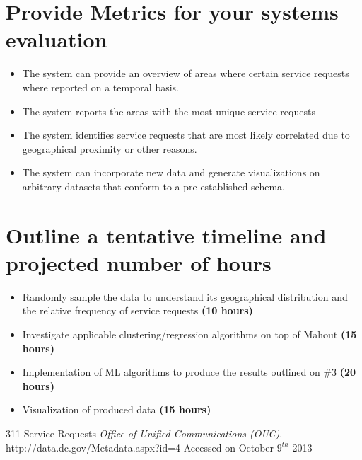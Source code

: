 \documentclass[a4paper,10pt]{article}
\begin{document}
\section{Provide Metrics for your systems evaluation}
\begin{itemize}
\item The system can provide an overview of areas where certain service requests where reported on a temporal basis. 
\item The system reports the areas with the most unique service requests
\item The system identifies service requests that are most likely correlated due to geographical proximity or other reasons.
\item The system can incorporate new data and generate visualizations on arbitrary datasets that conform to a pre-established schema.
\end{itemize}

\section{Outline a tentative timeline and projected number of hours}
\begin{itemize}
\item Randomly sample the data to understand its geographical distribution and the relative frequency of service requests \textbf{(10 hours)}
\item Investigate applicable clustering/regression algorithms on top of Mahout \textbf{(15 hours)}
\item Implementation of ML algorithms to produce the results outlined on \#3 \textbf{(20 hours)}
\item Visualization of produced data \textbf{(15 hours)}
\end{itemize}

\begin{thebibliography}{9}

  311 Service Requests \textit{Office of Unified Communications (OUC)}. http://data.dc.gov/Metadata.aspx?id=4 Accessed on October $9^{th}$ 2013

\end{thebibliography}
\end{document}

